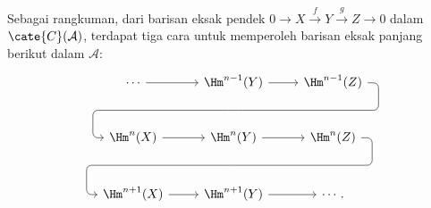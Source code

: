 Sebagai rangkuman, dari barisan eksak pendek
$0\to X\xrightarrow{f}Y\xrightarrow{g}Z\to0$ dalam
$\cate{C}(\mathcal{A})$, terdapat tiga cara untuk memperoleh barisan eksak
panjang berikut dalam $\mathcal{A}$:
\[\begin{tikzcd}[row sep=large]
	\cdots \arrow[r] & \Hm^{n-1}(Y) \arrow[r] \arrow[phantom, d, ""{coordinate, name=A}] & \Hm^{n-1}(Z) \arrow[dll, rounded corners, to path={
		-- ([xshift=2ex]\tikztostart.east)
		|- (A) [near end]\tikztonodes
		-| ([xshift=-2ex]\tikztotarget.west)
		-- (\tikztotarget)}] \\
	\Hm^n(X) \arrow[r] & \Hm^n(Y) \arrow[r] \arrow[phantom, d, ""{coordinate, name=B}] & \Hm^n(Z) \arrow[dll, rounded corners, to path={
		-- ([xshift=2ex]\tikztostart.east)
		|- (B) [near end]\tikztonodes
		-| ([xshift=-2ex]\tikztotarget.west)
		-- (\tikztotarget)}] \\
	\Hm^{n+1}(X) \arrow[r] & \Hm^{n+1}(Y) \arrow[r] & \cdots .
\end{tikzcd}\]
